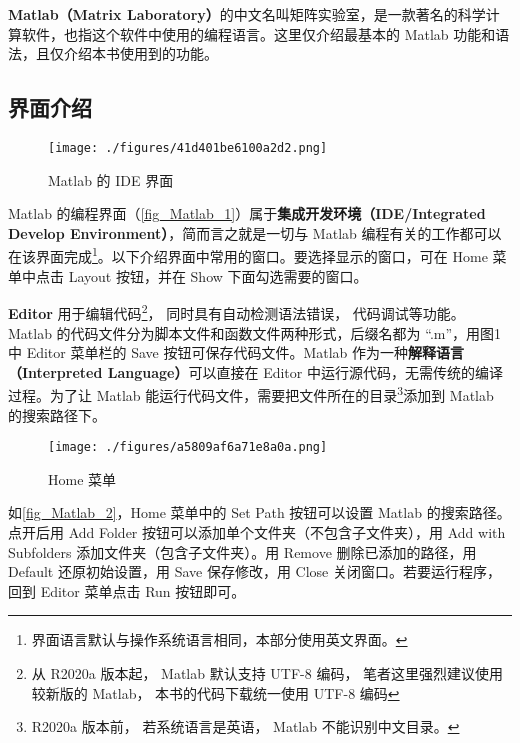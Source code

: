 
\textbf{Matlab（Matrix Laboratory）}的中文名叫矩阵实验室，是一款著名的科学计算软件，也指这个软件中使用的编程语言。这里仅介绍最基本的 Matlab 功能和语法，且仅介绍本书使用到的功能。


\subsection{界面介绍}

\begin{figure}[ht]
\centering
\texttt{[image: ./figures/41d401be6100a2d2.png]}
\caption{Matlab 的 IDE 界面}\label{fig_Matlab_1}
\end{figure}

Matlab 的编程界面（\autoref{fig_Matlab_1}）属于\textbf{集成开发环境（IDE/Integrated Develop Environment）}，简而言之就是一切与 Matlab 编程有关的工作都可以在该界面完成\footnote{界面语言默认与操作系统语言相同，本部分使用英文界面。}。以下介绍界面中常用的窗口。要选择显示的窗口，可在 Home 菜单中点击 Layout 按钮，并在 Show 下面勾选需要的窗口。

\textbf{Editor} 用于编辑代码\footnote{从 R2020a 版本起， Matlab 默认支持 UTF-8 编码， 笔者这里强烈建议使用较新版的 Matlab， 本书的代码下载统一使用 UTF-8 编码}， 同时具有自动检测语法错误， 代码调试等功能。 Matlab 的代码文件分为脚本文件和函数文件两种形式，后缀名都为 “.m”，用图1中 Editor 菜单栏的 Save 按钮可保存代码文件。Matlab 作为一种\textbf{解释语言（Interpreted Language）}可以直接在 Editor 中运行源代码，无需传统的编译过程。为了让 Matlab 能运行代码文件，需要把文件所在的目录\footnote{R2020a 版本前， 若系统语言是英语， Matlab 不能识别中文目录。}添加到 Matlab 的搜索路径下。

\begin{figure}[ht]
\centering
\texttt{[image: ./figures/a5809af6a71e8a0a.png]}
\caption{Home 菜单}\label{fig_Matlab_2}
\end{figure}

如\autoref{fig_Matlab_2}，Home 菜单中的 Set Path 按钮可以设置 Matlab 的搜索路径。点开后用 Add Folder 按钮可以添加单个文件夹（不包含子文件夹），用 Add with Subfolders 添加文件夹（包含子文件夹）。用 Remove 删除已添加的路径，用 Default 还原初始设置，用 Save 保存修改，用 Close 关闭窗口。若要运行程序，回到 Editor 菜单点击 Run 按钮即可。

